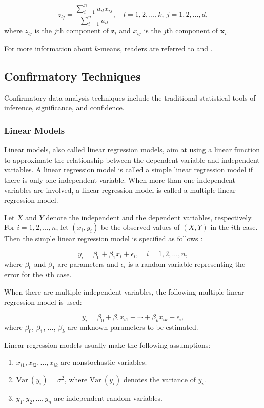 \documentclass[]{book}
\theoremstyle{definition}
\theoremstyle{definition}
\theoremstyle{definition}
\theoremstyle{remark}
\begin{document}
\[z_{lj} = \dfrac{\sum_{i=1}^n u_{il} x_{ij} } { \sum_{i=1}^n u_{il}},\quad l=1,2,\ldots,k,\: j=1,2,\ldots,d,\]
where \(z_{lj}\) is the \(j\)th component of \(\textbf{z}_l\) and
\(x_{ij}\) is the \(j\)th component of \(\textbf{x}_i\).

For more information about \(k\)-means, readers are referred to
\citep{gan2007} and \citep{mirkin2011}.

\subsection{Confirmatory Techniques}\label{confirmatory-techniques}

Confirmatory data analysis techniques include the traditional
statistical tools of inference, significance, and confidence.

\subsubsection{Linear Models}\label{linear-models}

Linear models, also called linear regression models, aim at using a
linear function to approximate the relationship between the dependent
variable and independent variables. A linear regression model is called
a simple linear regression model if there is only one independent
variable. When more than one independent variables are involved, a
linear regression model is called a multiple linear regression model.

Let \(X\) and \(Y\) denote the independent and the dependent variables,
respectively. For \(i=1,2,\ldots,n\), let \((x_i, y_i)\) be the observed
values of \((X,Y)\) in the \(i\)th case. Then the simple linear
regression model is specified as follows \citep{frees2009}:

\[y_i  = \beta_0 + \beta_1 x_i + \epsilon_i,\quad i=1,2,\ldots,n,\]
where \(\beta_0\) and \(\beta_1\) are parameters and \(\epsilon_i\) is a
random variable representing the error for the \(i\)th case.

When there are multiple independent variables, the following multiple
linear regression model is used:

\[y_i = \beta_0 + \beta_1 x_{i1} + \cdots + \beta_k x_{ik} + \epsilon_i,\]
where \(\beta_0\), \(\beta_1\), \(\ldots\), \(\beta_k\) are unknown
parameters to be estimated.

Linear regression models usually make the following assumptions:

\begin{enumerate}
\def\labelenumi{(\alph{enumi})}
\item
  \(x_{i1},x_{i2},\ldots,x_{ik}\) are nonstochastic variables.
\item
  \(\mathrm{Var~}(y_i)=\sigma^2\), where \(\mathrm{Var~}(y_i)\) denotes
  the variance of \(y_i\).
\item
  \(y_1,y_2,\ldots,y_n\) are independent random variables.
\end{enumerate}
\end{document}
